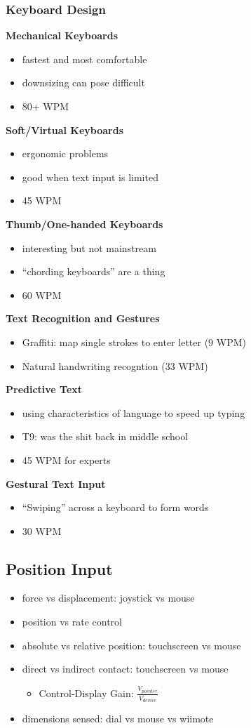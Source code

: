 \documentclass[]{article}
\theoremstyle{definition}
\begin{document}
	\subsubsection{Keyboard Design}
	\textbf{Mechanical Keyboards}
	\begin{itemize}
		\item fastest and most comfortable
		\item downsizing can pose difficult
		\item 80+ WPM
	\end{itemize}
	\textbf{Soft/Virtual Keyboards}
	\begin{itemize}
		\item ergonomic problems
		\item good when text input is limited
		\item 45 WPM
	\end{itemize}
	\textbf{Thumb/One-handed Keyboards}
	\begin{itemize}
		\item interesting but not mainstream
		\item ``chording keyboards'' are a thing
		\item 60 WPM
	\end{itemize}
	\textbf{Text Recognition and Gestures}
	\begin{itemize}
		\item Graffiti: map single strokes to enter letter (9 WPM)
		\item Natural handwriting recogntion (33 WPM)
	\end{itemize}
	\textbf{Predictive Text}
	\begin{itemize}
		\item using characteristics of language to speed up typing
		\item T9: was the shit back in middle school\
		\item 45 WPM for experts
	\end{itemize}
	\textbf{Gestural Text Input}
	\begin{itemize}
		\item ``Swiping'' across a keyboard to form words
		\item 30 WPM
	\end{itemize}

	\subsection{Position Input}
	\begin{itemize}
		\item force vs displacement: joystick vs mouse
		\item position vs rate control
		\item absolute vs relative position: touchscreen vs mouse
		\item direct vs indirect contact: touchscreen vs mouse
			\begin{itemize}
				\item Control-Display Gain: $\frac{V_{pointer}}{V_{device}}$
			\end{itemize}
		\item dimensions sensed: dial vs mouse vs wiimote
	\end{itemize}
\end{document}
